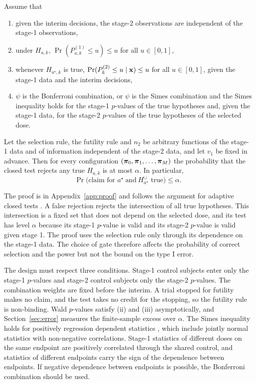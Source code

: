 \begin{theorem}\label{thm:t1e}
Assume that
\begin{enumerate}[label=(\roman*),leftmargin=*,nosep]
\item given the interim decisions, the stage-2 observations are independent of the stage-1 observations,
\item under $H_{a,k}$, $\Pr(P^{(1)}_{a,k}\le u)\le u$ for all $u\in[0,1]$,
\item whenever $H_{a^\star,k}$ is true, $\mathrm{Pr}(P^{(2)}_k\le u\mid\mathbf{x})\le u$ for all $u\in[0,1]$, given the stage-1 data and the interim decisions,
\item $\psi$ is the Bonferroni combination, or $\psi$ is the Simes combination and the Simes inequality holds for the stage-1 $p$-values of the true hypotheses and, given the stage-1 data, for the stage-2 $p$-values of the true hypotheses of the selected dose.
\end{enumerate}
Let the selection rule, the futility rule and $n_2$ be arbitrary functions of the stage-1 data and of information independent of the stage-2 data, and let $v_1$ be fixed in advance. Then for every configuration $(\bm{\pi}_0,\bm{\pi}_1,\dots,\bm{\pi}_M)$ the probability that the closed test rejects any true $H_{a,k}$ is at most $\alpha$. In particular,
\begin{equation*}
\Pr\big(\text{claim for }a^\star\ \text{and}\ H^\cup_{a^\star}\text{ true}\big)\le\alpha .
\end{equation*}
\end{theorem}

The proof is in Appendix~\ref{app:proof} and follows the argument for adaptive closed tests \citep{bauer1994,posch2005,bretz2006}. A false rejection rejects the intersection of all true hypotheses. This intersection is a fixed set that does not depend on the selected dose, and its test has level $\alpha$ because its stage-1 $p$-value is valid and its stage-2 $p$-value is valid given stage 1. The proof uses the selection rule only through its dependence on the stage-1 data. The choice of gate therefore affects the probability of correct selection and the power but not the bound on the type I error.

The design must respect three conditions. Stage-1 control subjects enter only the stage-1 $p$-values and stage-2 control subjects only the stage-2 $p$-values. The combination weights are fixed before the interim. A trial stopped for futility makes no claim, and the test takes no credit for the stopping, so the futility rule is non-binding. Wald $p$-values satisfy (ii) and (iii) asymptotically, and Section~\ref{sec:error} measures the finite-sample excess over $\alpha$. The Simes inequality holds for positively regression dependent statistics \citep{benjamini2001}, which include jointly normal statistics with non-negative correlations. Stage-1 statistics of different doses on the same endpoint are positively correlated through the shared control, and statistics of different endpoints carry the sign of the dependence between endpoints. If negative dependence between endpoints is possible, the Bonferroni combination should be used.

